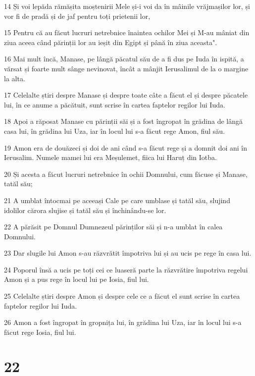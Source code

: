 \par 14 Și voi lepăda rămășita moștenirii Mele și-i voi da în mâinile vrăjmașilor lor, și vor fi de pradă și de jaf pentru toți prietenii lor,
\par 15 Pentru că au făcut lucruri netrebnice înaintea ochilor Mei și M-au mâniat din ziua aceea când părinții lor au ieșit din Egipt și până în ziua aceasta".
\par 16 Mai mult încă, Manase, pe lângă păcatul său de a fi dus pe Iuda în ispită, a vărsat și foarte mult sânge nevinovat, încât a mânjit Ierusalimul de la o margine la alta.
\par 17 Celelalte știri despre Manase și despre toate câte a făcut el și despre păcatele lui, în ce anume a păcătuit, sunt scrise în cartea faptelor regilor lui Iuda.
\par 18 Apoi a răposat Manase cu părinții săi și a fost îngropat în grădina de lângă casa lui, în grădina lui Uza, iar în locul lui s-a făcut rege Amon, fiul său.
\par 19 Amon era de douăzeci și doi de ani când s-a făcut rege și a domnit doi ani în Ierusalim. Numele mamei lui era Meșulemet, fiica lui Haruț din Iotba.
\par 20 Și acesta a făcut lucruri netrebnice în ochii Domnului, cum făcuse și Manase, tatăl său;
\par 21 A umblat întocmai pe aceeași Cale pe care umblase și tatăl său, slujind idolilor cărora slujise și tatăl său și închinându-se lor.
\par 22 A părăsit pe Domnul Dumnezeul părinților săi și n-a umblat în calea Domnului.
\par 23 Dar slugile lui Amon s-au răzvrătit împotriva lui și au ucis pe rege în casa lui.
\par 24 Poporul însă a ucis pe toți cei ce luaseră parte la răzvrătire împotriva regelui Amon și a pus rege în locul lui pe Iosia, fiul lui.
\par 25 Celelalte știri despre Amon și despre cele ce a făcut el sunt scrise în cartea faptelor regilor lui Iuda.
\par 26 Amon a fost îngropat în gropnița lui, în grădina lui Uza, iar în locul lui s-a făcut rege Iosia, fiul lui.

\chapter{22}

